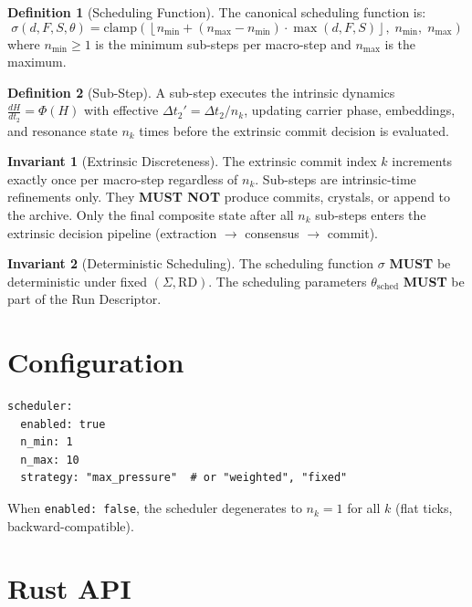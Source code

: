 \documentclass[11pt,a4paper,twoside]{article}
\theoremstyle{definition}
\newtheorem{definition}{Definition}[section]
\newtheorem{invariant}{Invariant}[section]
\theoremstyle{plain}
\theoremstyle{remark}
\begin{document}
\begin{definition}[Scheduling Function]\label{def:schedfunc}
The canonical scheduling function is:
\[
  \sigma(d, F, S, \theta) = \mathrm{clamp}\!\left(
    \left\lfloor n_{\min} + (n_{\max} - n_{\min}) \cdot
    \max(d, F, S) \right\rfloor,\;
    n_{\min},\; n_{\max}
  \right)
\]
where $n_{\min} \ge 1$ is the minimum sub-steps per macro-step and
$n_{\max}$ is the maximum.
\end{definition}

\begin{definition}[Sub-Step]\label{def:substep}
A sub-step executes the intrinsic dynamics
$\frac{dH}{dt_2} = \Phi(H)$
with effective $\Delta t_2' = \Delta t_2 / n_k$, updating carrier phase,
embeddings, and resonance state $n_k$ times before the extrinsic
commit decision is evaluated.
\end{definition}

\begin{invariant}[Extrinsic Discreteness]\label{inv:extrinsic}
The extrinsic commit index $k$ increments exactly once per macro-step
regardless of $n_k$. Sub-steps are intrinsic-time refinements only.
They \textbf{MUST NOT} produce commits, crystals, or append to the
archive. Only the final composite state after all $n_k$ sub-steps enters
the extrinsic decision pipeline (extraction $\to$ consensus $\to$
commit).
\end{invariant}

\begin{invariant}[Deterministic Scheduling]\label{inv:detsched}
The scheduling function $\sigma$ \textbf{MUST} be deterministic under
fixed $(\Sigma, \mathrm{RD})$. The scheduling parameters
$\theta_{\mathrm{sched}}$ \textbf{MUST} be part of the Run Descriptor.
\end{invariant}

\section{Configuration}\label{sec:sched:config}

\begin{verbatim}
scheduler:
  enabled: true
  n_min: 1
  n_max: 10
  strategy: "max_pressure"  # or "weighted", "fixed"
\end{verbatim}

When \texttt{enabled: false}, the scheduler degenerates to
$n_k = 1$ for all $k$ (flat ticks, backward-compatible).

\section{Rust API}\label{sec:sched:api}
\end{document}
